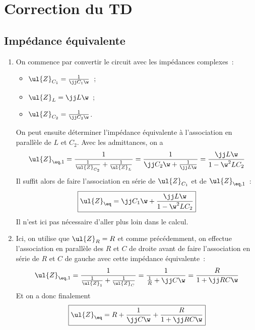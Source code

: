 \documentclass[a4paper, 12pt, final, garamond]{book}
\begin{document}
\setcounter{chapter}{4}

\chapter{Correction du TD}

\section{Impédance équivalente}
\begin{enumerate}
    \item On commence par convertir le circuit avec les impédances complexes~:
        \begin{itemize}
            \item $\ul{Z}_{C_1} = \frac{1}{\jj C_1\w}$~;
            \item $\ul{Z}_L = \jj L\w$~;
            \item $\ul{Z}_{C_2} = \frac{1}{\jj C_2\w}$.
        \end{itemize}
        On peut ensuite déterminer l'impédance équivalente à l'association en
        parallèle de $L$ et $C_2$. Avec les admittances, on a
        \begin{gather*}
            \ul{Z}_{\eq,1}
                = \frac{1}{\frac{1}{\ul{Z}_{C_2}} + \frac{1}{\ul{Z}_L}}
                = \frac{1}{\jj C_2\w + \frac{1}{\jj L\w}}
                = \frac{\jj L\w}{1 - \w^2LC_2}
        \end{gather*}
        Il suffit alors de faire l'association en série de $\ul{Z}_{C_1}$ et de
        $\ul{Z}_{\eq,1}$~:
        \begin{gather*}
            \boxed{
            \ul{Z}_{\eq} = \jj C_1\w + \frac{\jj L\w}{1 - \w^2LC_2}}
        \end{gather*}
        Il n'est ici pas nécessaire d'aller plus loin dans le calcul.

    \item Ici, on utilise que $\ul{Z}_R = R$ et comme précédemment, on effectue
        l'association en parallèle des $R$ et $C$ de droite avant de faire
        l'association en série de $R$ et $C$ de gauche avec cette impédance
        équivalente~:
        \begin{gather*}
            \ul{Z}_{\eq, 1}
                = \frac{1}{\frac{1}{\ul{Z}_1} + \frac{1}{\ul{Z}_C}}
                = \frac{1}{\frac{1}{R} + \jj C\w}
                = \frac{R}{1 + \jj RC\w}
        \end{gather*}
        Et on a donc finalement
        \begin{gather*}
            \boxed{
            \ul{Z}_{\eq} = R + \frac{1}{\jj C\w} + \frac{R}{1 + \jj RC\w}}
        \end{gather*}
\end{enumerate}
\end{document}
